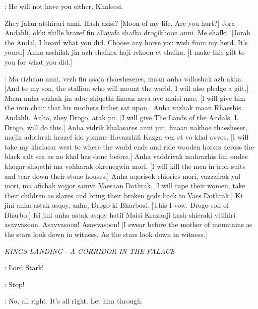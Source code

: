 \JORAH: He will not have you either, Khaleesi. 


Zhey jalan atthirari anni. Hash azisi? [Moon of my life. Are you hurt?] Jora Andahli, okki zhille hrazef fin allayafa shafka drogikhoon anni. Me shafki. [Jorah the Andal, I heard what you did. Choose any horse you wish from my herd. It's yours.] Anha asshilak jin azh shafkea haji rekoon et shafka. [I make this gift to you for what you did.]


\DROGO: Ma rizhaan anni, vezh fin asaja rhaesheseres, maan anha valloshak azh akka. [And to my son, the stallion who will mount the world, I will also pledge a gift.] Maan anha vazhak jin ador shiqethi finaan neva ave maisi mae. [I will give him the iron chair that his mothers father sat upon.] Anha vazhak maan Rhaeshis Andahli. Anha, zhey Drogo, atak jin. [I will give The Lands of the Andals. I, Drogo, will do this.] Anha vidrik khalasares anni jim, finaan nakhoe rhaesheser, majin adothrak hrazef ido yomme Havazzhifi Kazga ven et vo khal avvos. [I will take my khalasar west to where the world ends and ride wooden horses across the black salt sea as no khal has done before.] Anha vaddrivak mahrazhis fini ondee khogar shiqethi ma vohharak okrenegwin mori. [I will kill the men in iron suits and tear down their stone houses.] Anha aqorisok chiories mori, vazzafrok yal mori, ma afichak vojjor samva Vaesaan Dothrak. [I will rape their women, take their children as slaves and bring their broken gods back to Vaes Dothrak.] Ki jini anha astak asqoy, anha, Drogo ki Bharbosi. [This I vow. Drogo son of Bharbo.] Ki jini anha astak asqoy hatif Maisi Krazaaji kash shieraki vitihiri asavvasoon. Asavvasoon! Asavvasoon! [I swear before the mother of mountains as the stars look down in witness. As the stars look down in witness.] 


\scene

\textit{KINGS LANDING - A CORRIDOR IN THE PALACE} 


\PAGE:  Lord Stark!

\BANNERMAN: Stop! 

\NED: No, all right. It's all right. Let him through. 

